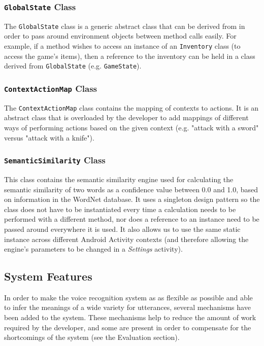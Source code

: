 \documentclass[11pt]{article}
\begin{document}
\subsubsection{\texttt{GlobalState} Class}

The \texttt{GlobalState} class is a generic abstract class that can be derived from in order to pass around environment objects between method calls easily. For example, if a method wishes to access an instance of an \texttt{Inventory} class (to access the game's items), then a reference to the inventory can be held in a class derived from \texttt{GlobalState} (e.g. \texttt{GameState}).

\subsubsection{\texttt{ContextActionMap} Class}

The \texttt{ContextActionMap} class contains the mapping of contexts to actions. It is an abstract class that is overloaded by the developer to add mappings of different ways of performing actions based on the given context (e.g. "attack with a sword" versus "attack with a knife").

\subsubsection{\texttt{SemanticSimilarity} Class}

This class contains the semantic similarity engine used for calculating the semantic similarity of two words as a confidence value between 0.0 and 1.0, based on information in the WordNet database. It uses a singleton design pattern so the class does not have to be instantiated every time a calculation needs to be performed with a different method, nor does a reference to an instance need to be passed around everywhere it is used. It also allows us to use the same static instance across different Android Activity contexts (and therefore allowing the engine's parameters to be changed in a \textit{Settings} activity).

\subsection{System Features}

In order to make the voice recognition system as as flexible as possible and able to infer the meanings of a wide variety for utterances, several mechanisms have been added to the system. These mechanisms help to reduce the amount of work required by the developer, and some are present in order to compensate for the shortcomings of the system (see the Evaluation section).
\end{document}
